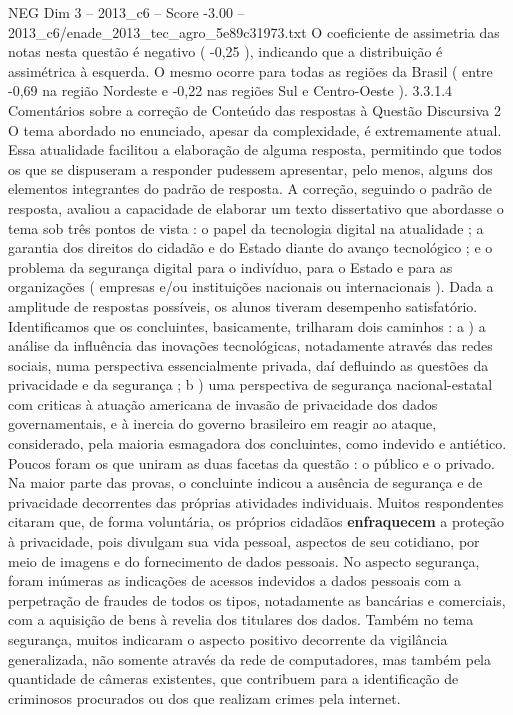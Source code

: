 \begin{textsample}{NEG Dim 3 – 2013\_c6 – Score -3.00 – 2013\_c6/enade\_2013\_tec\_agro\_5e89c31973.txt}
O coeficiente de assimetria das notas nesta questão é negativo ( -0,25 ), indicando que a distribuição é assimétrica à esquerda.
O mesmo ocorre para todas as regiões da Brasil ( entre -0,69 na região Nordeste e -0,22 nas regiões Sul e Centro-Oeste ). 3.3.1.4 Comentários sobre a correção de Conteúdo das respostas à Questão Discursiva 2 O tema abordado no enunciado, apesar da complexidade, é extremamente atual.
Essa atualidade facilitou a elaboração de alguma resposta, permitindo que todos os que se dispuseram a responder pudessem apresentar, pelo menos, alguns dos elementos integrantes do padrão de resposta.
A correção, seguindo o padrão de resposta, avaliou a capacidade de elaborar um texto dissertativo que abordasse o tema sob três pontos de vista : o papel da tecnologia digital na atualidade ; a garantia dos direitos do cidadão e do Estado diante do avanço tecnológico ; e o problema da segurança digital para o indivíduo, para o Estado e para as organizações ( empresas e/ou instituições nacionais ou internacionais ).
Dada a amplitude de respostas possíveis, os alunos tiveram desempenho satisfatório.
Identificamos que os concluintes, basicamente, trilharam dois caminhos : a ) a análise da influência das inovações tecnológicas, notadamente através das redes sociais, numa perspectiva essencialmente privada, daí defluindo as questões da privacidade e da segurança ; b ) uma perspectiva de segurança nacional-estatal com criticas à atuação americana de invasão de privacidade dos dados governamentais, e à inercia do governo brasileiro em reagir ao ataque, considerado, pela maioria esmagadora dos concluintes, como indevido e antiético.
Poucos foram os que uniram as duas facetas da questão : o público e o privado.
Na maior parte das provas, o concluinte indicou a ausência de segurança e de privacidade decorrentes das próprias atividades individuais.
Muitos respondentes citaram que, de forma voluntária, os próprios cidadãos \textbf{enfraquecem} a proteção à privacidade, pois divulgam sua vida pessoal, aspectos de seu cotidiano, por meio de imagens e do fornecimento de dados pessoais.
No aspecto segurança, foram inúmeras as indicações de acessos indevidos a dados pessoais com a perpetração de fraudes de todos os tipos, notadamente as bancárias e comerciais, com a aquisição de bens à revelia dos titulares dos dados.
Também no tema segurança, muitos indicaram o aspecto positivo decorrente da vigilância generalizada, não somente através da rede de computadores, mas também pela quantidade de câmeras existentes, que contribuem para a identificação de criminosos procurados ou dos que realizam crimes pela internet.

\end{textsample}
